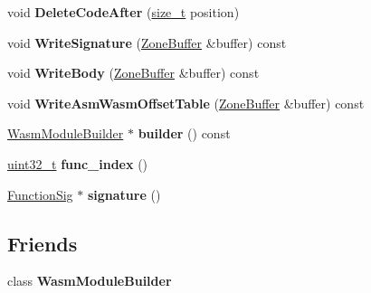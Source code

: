 \begin{DoxyCompactItemize}
\item 
\mbox{\label{classv8_1_1internal_1_1wasm_1_1WasmFunctionBuilder_afbe23250afd63a15d1158ee687ef85b4}} 
void {\bfseries Delete\+Code\+After} (\mbox{\hyperlink{classsize__t}{size\+\_\+t}} position)
\item 
\mbox{\label{classv8_1_1internal_1_1wasm_1_1WasmFunctionBuilder_af0dcf8bf2709c723972b6f28c8f2bf99}} 
void {\bfseries Write\+Signature} (\mbox{\hyperlink{classv8_1_1internal_1_1wasm_1_1ZoneBuffer}{Zone\+Buffer}} \&buffer) const
\item 
\mbox{\label{classv8_1_1internal_1_1wasm_1_1WasmFunctionBuilder_a756d3f1c1efcc3caa8ccba05e95ec125}} 
void {\bfseries Write\+Body} (\mbox{\hyperlink{classv8_1_1internal_1_1wasm_1_1ZoneBuffer}{Zone\+Buffer}} \&buffer) const
\item 
\mbox{\label{classv8_1_1internal_1_1wasm_1_1WasmFunctionBuilder_ae880713ff8e74b57e27b2fbacd8f631d}} 
void {\bfseries Write\+Asm\+Wasm\+Offset\+Table} (\mbox{\hyperlink{classv8_1_1internal_1_1wasm_1_1ZoneBuffer}{Zone\+Buffer}} \&buffer) const
\item 
\mbox{\label{classv8_1_1internal_1_1wasm_1_1WasmFunctionBuilder_a2f90602324f3d9ec3437fdafbb33007d}} 
\mbox{\hyperlink{classv8_1_1internal_1_1wasm_1_1WasmModuleBuilder}{Wasm\+Module\+Builder}} $\ast$ {\bfseries builder} () const
\item 
\mbox{\label{classv8_1_1internal_1_1wasm_1_1WasmFunctionBuilder_a1736499fe04af0512bb1fa7086497a0d}} 
\mbox{\hyperlink{classuint32__t}{uint32\+\_\+t}} {\bfseries func\+\_\+index} ()
\item 
\mbox{\label{classv8_1_1internal_1_1wasm_1_1WasmFunctionBuilder_ac41f86b89acde6444088c7f3b721f3da}} 
\mbox{\hyperlink{classv8_1_1internal_1_1Signature}{Function\+Sig}} $\ast$ {\bfseries signature} ()
\end{DoxyCompactItemize}
\subsection*{Friends}
\begin{DoxyCompactItemize}
\item 
\mbox{\label{classv8_1_1internal_1_1wasm_1_1WasmFunctionBuilder_ace63ff4bed9fda245c733e10c4a9714b}} 
class {\bfseries Wasm\+Module\+Builder}
\end{DoxyCompactItemize}


